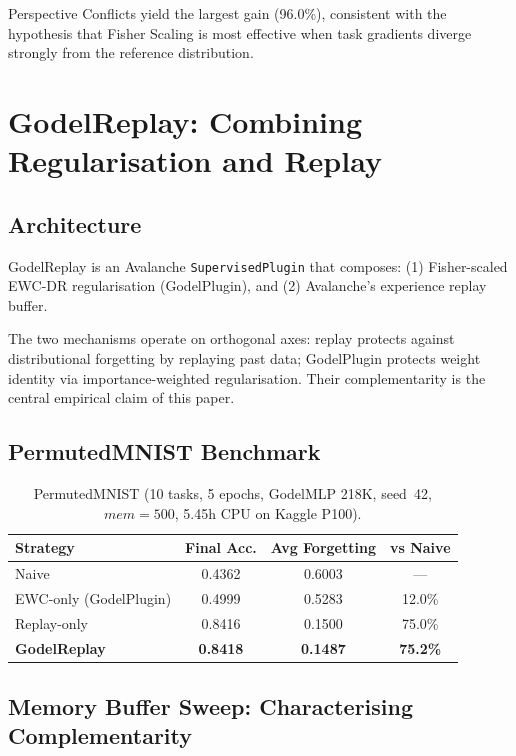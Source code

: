 \documentclass[12pt]{article}
\newcommand{\godelreplay}{GodelReplay\xspace}
\begin{document}
Perspective Conflicts yield the largest gain (96.0\%), consistent with the
hypothesis that Fisher Scaling is most effective when task gradients diverge
strongly from the reference distribution.

\section{GodelReplay: Combining Regularisation and Replay}
\label{sec:godelreplay}

\subsection{Architecture}

\godelreplay is an Avalanche \texttt{SupervisedPlugin} that composes:
(1) Fisher-scaled EWC-DR regularisation (GodelPlugin), and
(2) Avalanche's experience replay buffer.

The two mechanisms operate on orthogonal axes: replay protects against
distributional forgetting by replaying past data; GodelPlugin protects
weight identity via importance-weighted regularisation.
Their complementarity is the central empirical claim of this paper.

\subsection{PermutedMNIST Benchmark}

\begin{table}[ht]
\centering
\caption{PermutedMNIST (10 tasks, 5 epochs, GodelMLP 218K, seed~42,
  $\mathit{mem}{=}500$, 5.45h CPU on Kaggle P100).}
\label{tab:permuted}
\begin{tabular}{lccc}
\toprule
\textbf{Strategy} & \textbf{Final Acc.} & \textbf{Avg Forgetting} & \textbf{vs Naive} \\
\midrule
Naive               & 0.4362 & 0.6003 & --- \\
EWC-only (GodelPlugin) & 0.4999 & 0.5283 & 12.0\% \\
Replay-only         & 0.8416 & 0.1500 & 75.0\% \\
\textbf{\godelreplay} & \textbf{0.8418} & \textbf{0.1487} & \textbf{75.2\%} \\
\bottomrule
\end{tabular}
\end{table}

\subsection{Memory Buffer Sweep: Characterising Complementarity}
\end{document}
